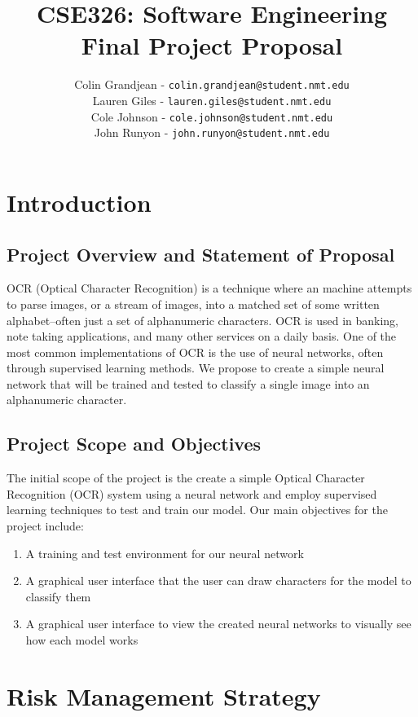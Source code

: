 \documentclass[english,12pt]{article}
\author{
        Colin Grandjean - \texttt{colin.grandjean@student.nmt.edu} \\
        Lauren Giles - \texttt{lauren.giles@student.nmt.edu} \\
        Cole Johnson - \texttt{cole.johnson@student.nmt.edu} \\
        John Runyon  - \texttt{john.runyon@student.nmt.edu}
}
\title{ \textbf{CSE326: Software Engineering} \\
        Final Project Proposal
}
\begin{document}
\maketitle
{\footnotesize\tableofcontents} %
\pagebreak
\section{Introduction}

\subsection{Project Overview and Statement of Proposal}
OCR (Optical Character Recognition) is a technique where an machine attempts
to parse images, or a stream of images, into a matched set of some written
alphabet--often just a set of alphanumeric characters. OCR is used in banking,
note taking applications, and many other services on a daily basis.
One of the most common implementations of OCR is the use of neural networks,
often through supervised learning methods. We propose to create a simple neural
network that will be trained and tested to classify a single image into an
alphanumeric character.

\subsection{Project Scope and Objectives}
The initial scope of the project is the create a simple Optical Character Recognition (OCR)
system using a neural network and employ supervised learning techniques to test and train our
model. Our main objectives for the project include:
\begin{enumerate}[(a.)]
  \item A training and test environment for our neural network
  \item A graphical user interface that the user can draw characters
    for the model to classify them
  \item A graphical user interface to view the created neural networks to
    visually see how each model works
\end{enumerate}

\section{Risk Management Strategy}
\end{document}
